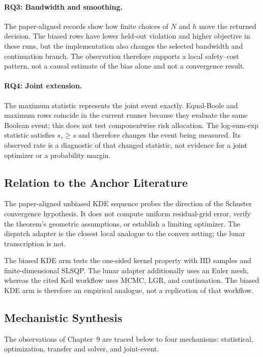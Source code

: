 \paragraph*{RQ3: Bandwidth and smoothing.}
The paper-aligned records show how finite choices of $N$ and $h$ move the
returned decision. The biased rows have lower held-out violation and higher
objective in these runs, but the implementation also changes the selected
bandwidth and continuation branch. The observation therefore supports a local
safety--cost pattern, not a causal estimate of the bias alone and not a
convergence result.

\paragraph*{RQ4: Joint extension.}
The maximum statistic represents the joint event exactly. Equal-Boole and
maximum rows coincide in the current runner because they evaluate the same
Boolean event; this does not test componentwise risk allocation. The
log-sum-exp statistic satisfies $s_\tau\geq s$ and therefore changes the event
being measured. Its observed rate is a diagnostic of that changed statistic,
not evidence for a joint optimizer or a probability margin.

\subsection{Relation to the Anchor Literature}
\label{sec:discussion-literature}

The paper-aligned unbiased KDE sequence probes the direction of the Schuster
convergence hypothesis. It does not compute uniform residual-grid error,
verify the theorem's geometric assumptions, or establish a limiting optimizer.
The dispatch adapter is the closest local analogue to the convex setting; the
lunar transcription is not.

The biased KDE arm tests the one-sided kernel property with IID
samples and finite-dimensional SLSQP. The lunar adapter additionally uses an
Euler mesh, whereas the cited Keil workflow uses MCMC, LGR, and continuation.
The biased KDE arm is therefore an empirical analogue, not a replication of that
workflow.

\subsection{Mechanistic Synthesis}
\label{sec:discussion-mechanisms}

The observations of Chapter~9 are traced below to four mechanisms:
statistical, optimization, transfer and solver, and joint-event.

